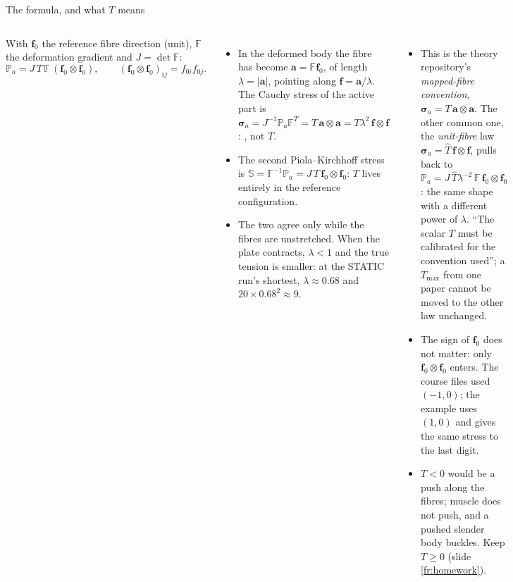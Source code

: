 \documentclass[aspectratio=169,11pt]{beamer}
\begin{document}
\begin{frame}{The formula, and what $T$ means}
\label{fr:formula}
\footnotesize
\begin{columns}[T]
With $\mathbf{f}_0$ the reference fibre direction (unit), $\mathbb{F}$ the deformation gradient and $J = \det\mathbb{F}$:
\[ \mathbb{P}_a = J\,T\,\mathbb{F}\,(\mathbf{f}_0\otimes\mathbf{f}_0),\qquad (\mathbf{f}_0\otimes\mathbf{f}_0)_{ij} = f_{0i}f_{0j}. \]
\begin{itemize}
  \item In the deformed body the fibre has become $\mathbf{a} = \mathbb{F}\mathbf{f}_0$, of length $\lambda = |\mathbf{a}|$, pointing along $\mathbf{f} = \mathbf{a}/\lambda$. The Cauchy stress of the active part is $\boldsymbol{\sigma}_a = J^{-1}\mathbb{P}_a\mathbb{F}^T = T\,\mathbf{a}\otimes\mathbf{a} = T\lambda^2\,\mathbf{f}\otimes\mathbf{f}$: , not $T$.
  \item The second Piola--Kirchhoff stress is $\mathbb{S} = \mathbb{F}^{-1}\mathbb{P}_a = J\,T\,\mathbf{f}_0\otimes\mathbf{f}_0$: $T$ lives entirely in the reference configuration.
  \item The two agree only while the fibres are unstretched. When the plate contracts, $\lambda < 1$ and the true tension is smaller: at the STATIC run's shortest, $\lambda \approx 0.68$ and $20\times0.68^2 \approx 9$.
\end{itemize}
\begin{itemize}
  \item This is the theory repository's \emph{mapped-fibre convention}, $\boldsymbol{\sigma}_a = T\,\mathbf{a}\otimes\mathbf{a}$. The other common one, the \emph{unit-fibre} law $\boldsymbol{\sigma}_a = \widehat{T}\,\mathbf{f}\otimes\mathbf{f}$, pulls back to $\mathbb{P}_a = J\,\widehat{T}\lambda^{-2}\,\mathbb{F}\,\mathbf{f}_0\otimes\mathbf{f}_0$: the same shape with a different power of $\lambda$. ``The scalar $T$ must be calibrated for the convention used''; a $T_{\max}$ from one paper cannot be moved to the other law unchanged.
  \item The sign of $\mathbf{f}_0$ does not matter: only $\mathbf{f}_0\otimes\mathbf{f}_0$ enters. The course files used $(-1, 0)$; the example uses $(1, 0)$ and gives the same stress to the last digit.
  \item $T < 0$ would be a push along the fibres; muscle does not push, and a pushed slender body buckles. Keep $T \ge 0$ (slide \ref{fr:homework}).
\end{itemize}
\end{columns}
\end{frame}
\end{document}
